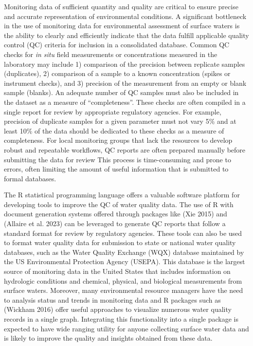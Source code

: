 Monitoring data of sufficient quantity and quality are critical to ensure precise and accurate representation of environmental conditions. A significant bottleneck in the use of monitoring data for environmental assessment of surface waters is the ability to clearly and efficiently indicate that the data fulfill applicable quality control (QC) criteria for inclusion in a consolidated database. Common QC checks for \emph{in situ} field measurements or concentrations measured in the laboratory may include 1) comparison of the precision between replicate samples (duplicates), 2) comparison of a sample to a known concentration (spikes or instrument checks), and 3) precision of the measurement from an empty or blank sample (blanks). An adequate number of QC samples must also be included in the dataset as a measure of ``completeness''. These checks are often compiled in a single report for review by appropriate regulatory agencies. For example, precision of duplicate samples for a given parameter must not vary 5\% and at least 10\% of the data should be dedicated to these checks as a measure of completeness. For local monitoring groups that lack the resources to develop robust and repeatable workflows, QC reports are often prepared manually before submitting the data for review This process is time-consuming and prone to errors, often limiting the amount of useful information that is submitted to formal databases.

The R statistical programming language offers a valuable software platform for developing tools to improve the QC of water quality data. The use of R with document generation systems offered through packages like  (Xie 2015) and  (Allaire et al. 2023) can be leveraged to generate QC reports that follow a standard format for review by regulatory agencies. These tools can also be used to format water quality data for submission to state or national water quality databases, such as the Water Quality Exchange (WQX) database maintained by the US Environmental Protection Agency (USEPA). This database is the largest source of monitoring data in the United States that includes information on hydrologic conditions and chemical, physical, and biological measurements from surface waters. Moreover, many environmental resource managers have the need to analysis status and trends in monitoring data and R packages such as  (Wickham 2016) offer useful approaches to visualize numerous water quality records in a single graph. Integrating this functionality into a single package is expected to have wide ranging utility for anyone collecting surface water data and is likely to improve the quality and insights obtained from these data.

